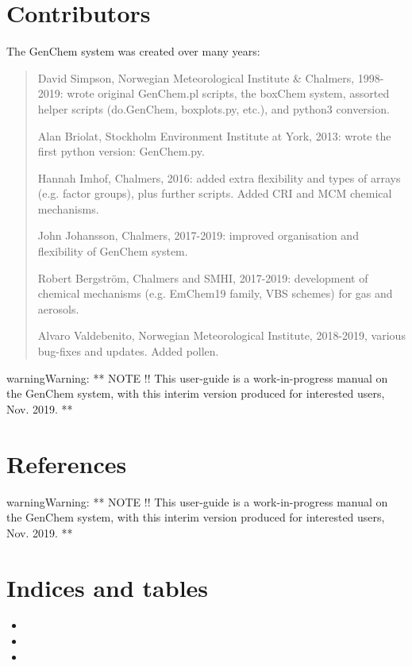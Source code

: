 \documentclass[a4paper,10pt,english]{sphinxmanual}
\begin{document}
\chapter{Contributors}
\label{\detokenize{GenChemDoc_contributors:contributors}}\label{\detokenize{GenChemDoc_contributors::doc}}
The GenChem system was created over many years:
\begin{quote}

David Simpson, Norwegian Meteorological Institute \& Chalmers,
1998-2019: wrote original GenChem.pl scripts, the
boxChem system, assorted helper scripts (do.GenChem, boxplots.py, etc.),
and python3 conversion.

Alan Briolat, Stockholm Environment Institute at York,  2013: wrote the
first python version: GenChem.py.

Hannah Imhof, Chalmers,  2016: added extra flexibility and types
of arrays (e.g. factor groups), plus further scripts.  Added
CRI and MCM chemical mechanisms.

John Johansson, Chalmers, 2017-2019: improved organisation and
flexibility of GenChem system.

Robert Bergström, Chalmers and SMHI, 2017-2019: development of
chemical mechanisms (e.g. EmChem19 family, VBS schemes) for gas and aerosols.

Alvaro Valdebenito, Norwegian Meteorological Institute, 2018-2019,
various bug-fixes and updates. Added pollen.
\end{quote}

\begin{sphinxadmonition}{warning}{Warning:}
**  NOTE !!
This user-guide is a work-in-progress manual on the GenChem system,
with this interim version produced for interested users, Nov. 2019.
**
\end{sphinxadmonition}


\chapter{References}
\label{\detokenize{GenChemDoc_refs:references}}\label{\detokenize{GenChemDoc_refs::doc}}
\begin{sphinxadmonition}{warning}{Warning:}
**  NOTE !!
This user-guide is a work-in-progress manual on the GenChem system,
with this interim version produced for interested users, Nov. 2019.
**
\end{sphinxadmonition}


\chapter{Indices and tables}
\label{\detokenize{index:indices-and-tables}}\begin{itemize}
\item {} 

\item {} 

\item {} 

\end{itemize}
\end{document}

